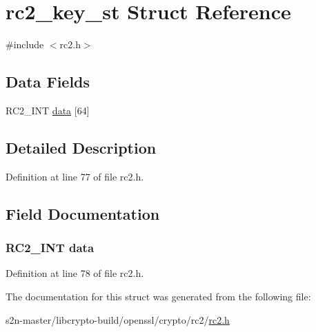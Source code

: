 \hypertarget{structrc2__key__st}{}\section{rc2\+\_\+key\+\_\+st Struct Reference}
\label{structrc2__key__st}


{\ttfamily \#include $<$rc2.\+h$>$}

\subsection*{Data Fields}
\begin{DoxyCompactItemize}
\item 
R\+C2\+\_\+\+I\+NT \hyperlink{structrc2__key__st_adef895c1fb82465dfa91c5fac0400694}{data} \mbox{[}64\mbox{]}
\end{DoxyCompactItemize}


\subsection{Detailed Description}


Definition at line 77 of file rc2.\+h.



\subsection{Field Documentation}
\subsubsection[{\texorpdfstring{data}{data}}]{\setlength{\rightskip}{0pt plus 5cm}R\+C2\+\_\+\+I\+NT data}\hypertarget{structrc2__key__st_adef895c1fb82465dfa91c5fac0400694}{}\label{structrc2__key__st_adef895c1fb82465dfa91c5fac0400694}


Definition at line 78 of file rc2.\+h.



The documentation for this struct was generated from the following file\+:\begin{DoxyCompactItemize}
\item 
s2n-\/master/libcrypto-\/build/openssl/crypto/rc2/\hyperlink{crypto_2rc2_2rc2_8h}{rc2.\+h}\end{DoxyCompactItemize}
